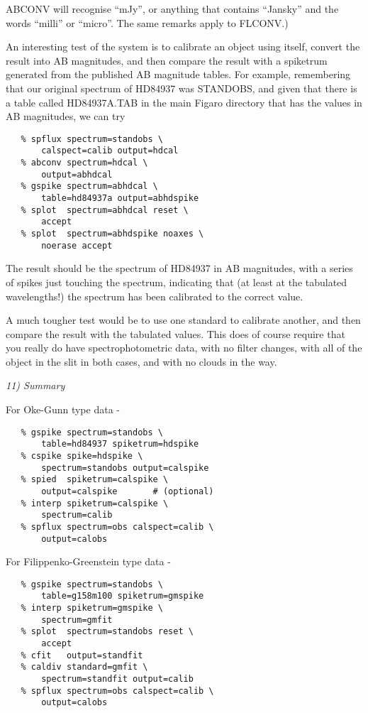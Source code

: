 ABCONV will recognise ``mJy'', or anything that contains ``Jansky''
and the words ``milli'' or ``micro''.  The same remarks apply to FLCONV.)

An interesting test of the system is to calibrate an object
using itself, convert the result into AB magnitudes, and then compare
the result with a spike\-trum generated from the published AB magnitude
tables.  For example, remembering that our original spectrum of HD84937
was STANDOBS, and given that there is a table called HD84937A.TAB in the
main Figaro directory that has the values in AB magnitudes, we can try

\begin{verbatim}
   % spflux spectrum=standobs \
       calspect=calib output=hdcal
   % abconv spectrum=hdcal \
       output=abhdcal
   % gspike spectrum=abhdcal \
       table=hd84937a output=abhdspike
   % splot  spectrum=abhdcal reset \
       accept
   % splot  spectrum=abhdspike noaxes \
       noerase accept
\end{verbatim}

The result should be the spectrum of HD84937 in AB magnitudes, with
a series of spikes just touching the spectrum, indicating that (at least
at the tabulated wavelengths!) the spectrum has been calibrated to the correct
value.

A much tougher test would be to use one standard to calibrate another,
and then compare the result with the tabulated values.  This does of course
require that you really do have spectrophotometric data, with no filter
changes, with all of the object in the slit in both cases, and with no
clouds in the way.


\goodbreak
\vspace{12pt}
{\it 11) Summary}

For Oke-Gunn type data -

\begin{verbatim}
   % gspike spectrum=standobs \
       table=hd84937 spiketrum=hdspike
   % cspike spike=hdspike \
       spectrum=standobs output=calspike
   % spied  spiketrum=calspike \
       output=calspike       # (optional)
   % interp spiketrum=calspike \
       spectrum=calib
   % spflux spectrum=obs calspect=calib \
       output=calobs
\end{verbatim}

For Filippenko-Greenstein type data -

\begin{verbatim}
   % gspike spectrum=standobs \
       table=g158m100 spiketrum=gmspike
   % interp spiketrum=gmspike \
       spectrum=gmfit
   % splot  spectrum=standobs reset \
       accept
   % cfit   output=standfit
   % caldiv standard=gmfit \
       spectrum=standfit output=calib
   % spflux spectrum=obs calspect=calib \
       output=calobs
\end{verbatim}


